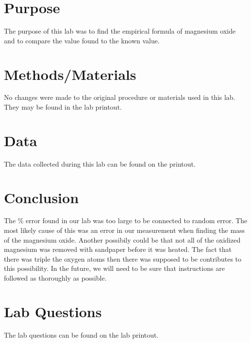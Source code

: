 \documentclass{article}
\begin{document}

\section{Purpose}

	The purpose of this lab was to find the empirical formula of magnesium oxide and to compare the value found to the known value.

\section{Methods/Materials}

	No changes were made to the original procedure or materials used in this lab. They may be found in the lab printout.

\section{Data}

	The data collected during this lab can be found on the printout.

\section{Conclusion}

	The \% error found in our lab was too large to be connected to random error. The most likely cause of this was an error in our measurement when finding the mass of the magnesium oxide. Another possibily could be that not all of the oxidized magnesium was removed with sandpaper before it was heated. The fact that there was triple the oxygen atoms then there was supposed to be contributes to this possibility. In the future, we will need to be sure that instructions are followed as thoroughly as possible.

\section{Lab Questions}

	The lab questions can be found on the lab printout.
\end{document}

